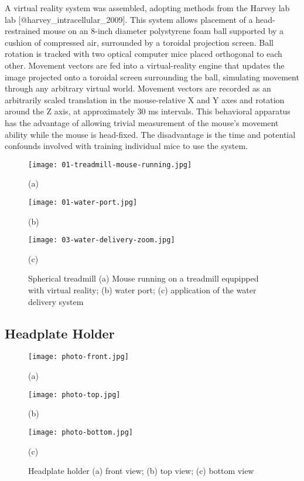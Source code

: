 \documentclass[../main.tex]{subfiles}
\begin{document}
A virtual reality system was assembled, adopting methods from the Harvey lab lab {[}@harvey\_intracellular\_2009{]}.
This system allows placement of a head-restrained mouse on an 8-inch diameter polystyrene foam ball supported by a cushion of compressed air, surrounded by a toroidal projection screen.
Ball rotation is tracked with two optical computer mice placed orthogonal to each other.
Movement vectors are fed into a virtual-reality engine that updates the image projected onto a toroidal screen surrounding the ball, simulating movement through any arbitrary virtual world.
Movement vectors are recorded as an arbitrarily scaled translation in the mouse-relative X and Y axes and rotation around the Z axis, at approximately 30 ms intervals.
This behavioral apparatus has the advantage of allowing trivial measurement of the mouse's movement ability while the mouse is head-fixed.
The disadvantage is the time and potential confounds involved with training individual mice to use the system.

\begin{figure}[htb]
	\begin{minipage}[t]{0.32\linewidth}\centering
		\texttt{[image: 01-treadmill-mouse-running.jpg]}
		\centerline{(a)}
	\end{minipage}
	\hfill
	\begin{minipage}[t]{0.15\linewidth}\centering
		\texttt{[image: 01-water-port.jpg]}
		\centerline{(b)}
	\end{minipage}
	\begin{minipage}[t]{0.45\linewidth}\centering
		\texttt{[image: 03-water-delivery-zoom.jpg]}
		\centerline{(c)}
	\end{minipage}
	\caption{
		Spherical treadmill (a) Mouse running on a treadmill equpipped with virtual reality;
		(b) water port; (c) application of the water delivery system }
	\label{fig:Spherical treadmill}
\end{figure}

\subsection{
	Headplate Holder}\label{headplate-holder}

\begin{figure}[htb]
	\begin{minipage}[t]{0.32\linewidth}\centering \texttt{[image: photo-front.jpg]} \centerline{(a)}
	\end{minipage}
	\hfill
	\begin{minipage}[t]{0.32\linewidth}\centering \texttt{[image: photo-top.jpg]} \centerline{(b)}
	\end{minipage}
	\begin{minipage}[t]{0.32\linewidth}\centering \texttt{[image: photo-bottom.jpg]} \centerline{(c)}
	\end{minipage}
	\caption{Headplate holder (a) front view;
		(b) top view; (c) bottom view}
	\label{fig:Spherical treadmill}
\end{figure}
\end{document}
